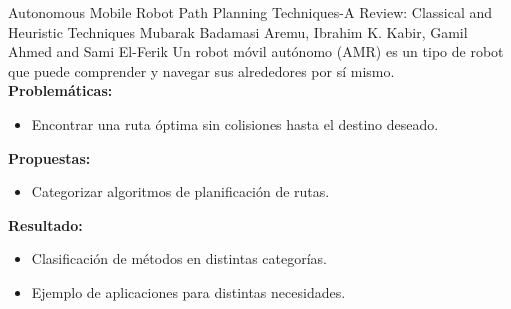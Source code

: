 \documentclass[10pt,aspectratio=169]{beamer}
\begin{document}
\begin{frame}{Autonomous Mobile Robot Path Planning Techniques-A Review: Classical and Heuristic Techniques \scriptsize{Mubarak Badamasi Aremu, Ibrahim K. Kabir, Gamil Ahmed and Sami El-Ferik}}
  Un robot móvil autónomo (AMR) es un tipo de robot que puede comprender y navegar sus alrededores por sí mismo.\\

  \textbf{Problemáticas:}
  \begin{itemize}
    \item Encontrar una ruta óptima sin colisiones hasta el destino deseado.
  \end{itemize}

  \textbf{Propuestas:}
  \begin{itemize}
    \item Categorizar algoritmos de planificación de rutas.
  \end{itemize}

  \textbf{Resultado:}
  \begin{itemize}
    \item Clasificación de métodos en distintas categorías. 
    \item Ejemplo de aplicaciones para distintas necesidades.
  \end{itemize}
\end{frame}
\end{document}
